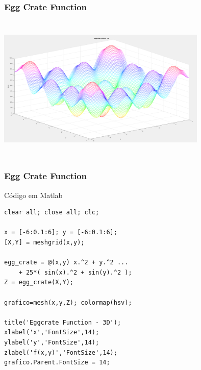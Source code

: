 \documentclass{beamer}
\begin{document}
\begin{frame}
	\frametitle{Egg Crate Function} 
	\centering
	\includegraphics[width=10cm,height=7cm]{eggcrate.png}
\end{frame}

\begin{frame}[fragile]
	\frametitle{Egg Crate Function}
	\begin{block}{Código em Matlab}
		\begin{lstlisting}
clear all; close all; clc;

x = [-6:0.1:6]; y = [-6:0.1:6];
[X,Y] = meshgrid(x,y);

egg_crate = @(x,y) x.^2 + y.^2 ...
    + 25*( sin(x).^2 + sin(y).^2 );
Z = egg_crate(X,Y);

grafico=mesh(x,y,Z); colormap(hsv);

title('Eggcrate Function - 3D');
xlabel('x','FontSize',14); 
ylabel('y','FontSize',14); 
zlabel('f(x,y)','FontSize',14);
grafico.Parent.FontSize = 14;
		\end{lstlisting}
	\end{block}	
\end{frame}
\end{document}
